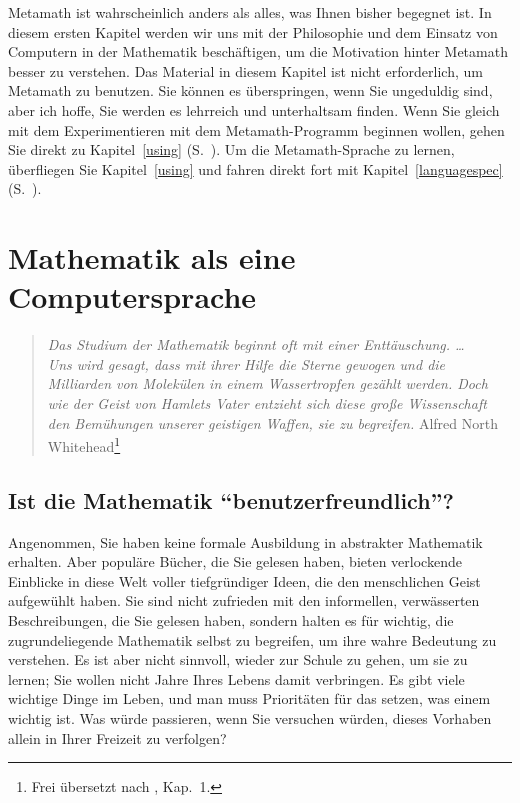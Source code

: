 Metamath ist wahrscheinlich anders als alles, was Ihnen bisher begegnet ist.  In diesem ersten Kapitel werden wir uns mit der Philosophie und dem Einsatz von Computern in der Mathematik beschäftigen, um die Motivation hinter Metamath besser zu verstehen. Das Material in diesem Kapitel ist nicht erforderlich, um Metamath zu benutzen.  Sie können es überspringen, wenn Sie ungeduldig sind, aber ich hoffe, Sie werden es lehrreich und unterhaltsam finden.  Wenn Sie gleich mit dem Experimentieren mit dem Metamath-Programm beginnen wollen, gehen Sie direkt zu Kapitel~\ref{using}
(S.~\pageref{using}).  Um die Metamath-Sprache zu lernen, überfliegen Sie Kapitel~\ref{using} und fahren direkt fort mit Kapitel~\ref{languagespec} (S.~\pageref{languagespec}).


\section{Mathematik als eine Computersprache}

\begin{quote}
  
  {\em Das Studium der Mathematik beginnt oft mit einer Enttäuschung. \ldots \\
  	Uns wird gesagt, dass mit ihrer Hilfe die Sterne gewogen und die Milliarden von Molekülen in einem Wassertropfen gezählt werden.  Doch wie der Geist von Hamlets Vater entzieht sich diese große Wissenschaft den Bemühungen unserer geistigen Waffen, sie zu begreifen.}
  \flushright\sc  Alfred North Whitehead\footnote{Frei übersetzt nach \cite{Whitehead}, Kap.\ 1.}\\
\end{quote}

\subsection{Ist die Mathematik "`benutzerfreundlich"'?}

Angenommen, Sie haben keine formale Ausbildung in abstrakter Mathematik erhalten.  Aber populäre Bücher, die Sie gelesen haben, bieten verlockende Einblicke in diese Welt voller tiefgründiger Ideen, die den menschlichen Geist aufgewühlt haben.  Sie sind nicht zufrieden mit den informellen, verwässerten Beschreibungen, die Sie gelesen haben, sondern halten es für wichtig, die zugrundeliegende Mathematik selbst zu begreifen, um ihre wahre Bedeutung zu verstehen.  Es ist aber nicht sinnvoll, wieder zur Schule zu gehen, um sie zu lernen; Sie wollen nicht Jahre Ihres Lebens damit verbringen.  Es gibt viele wichtige Dinge im Leben, und man muss Prioritäten für das setzen, was einem wichtig ist.  Was würde passieren, wenn Sie versuchen würden, dieses Vorhaben allein in Ihrer Freizeit zu verfolgen?

